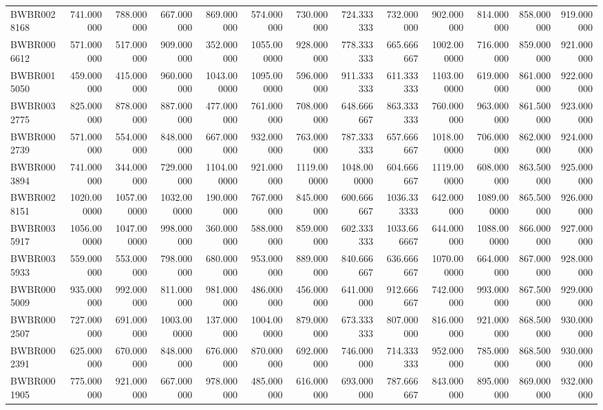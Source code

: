 \begin{longtable}{lrrrrrrrrrrrr}
BWBR0028168 & 741.000000 & 788.000000 & 667.000000 & 869.000000 & 574.000000 & 730.000000 & 724.333333 & 732.000000 & 902.000000 & 814.000000 & 858.000000 & 919.000000 \\
BWBR0006612 & 571.000000 & 517.000000 & 909.000000 & 352.000000 & 1055.000000 & 928.000000 & 778.333333 & 665.666667 & 1002.000000 & 716.000000 & 859.000000 & 921.000000 \\
BWBR0015050 & 459.000000 & 415.000000 & 960.000000 & 1043.000000 & 1095.000000 & 596.000000 & 911.333333 & 611.333333 & 1103.000000 & 619.000000 & 861.000000 & 922.000000 \\
BWBR0032775 & 825.000000 & 878.000000 & 887.000000 & 477.000000 & 761.000000 & 708.000000 & 648.666667 & 863.333333 & 760.000000 & 963.000000 & 861.500000 & 923.000000 \\
BWBR0002739 & 571.000000 & 554.000000 & 848.000000 & 667.000000 & 932.000000 & 763.000000 & 787.333333 & 657.666667 & 1018.000000 & 706.000000 & 862.000000 & 924.000000 \\
BWBR0003894 & 741.000000 & 344.000000 & 729.000000 & 1104.000000 & 921.000000 & 1119.000000 & 1048.000000 & 604.666667 & 1119.000000 & 608.000000 & 863.500000 & 925.000000 \\
BWBR0028151 & 1020.000000 & 1057.000000 & 1032.000000 & 190.000000 & 767.000000 & 845.000000 & 600.666667 & 1036.333333 & 642.000000 & 1089.000000 & 865.500000 & 926.000000 \\
BWBR0035917 & 1056.000000 & 1047.000000 & 998.000000 & 360.000000 & 588.000000 & 859.000000 & 602.333333 & 1033.666667 & 644.000000 & 1088.000000 & 866.000000 & 927.000000 \\
BWBR0035933 & 559.000000 & 553.000000 & 798.000000 & 680.000000 & 953.000000 & 889.000000 & 840.666667 & 636.666667 & 1070.000000 & 664.000000 & 867.000000 & 928.000000 \\
BWBR0005009 & 935.000000 & 992.000000 & 811.000000 & 981.000000 & 486.000000 & 456.000000 & 641.000000 & 912.666667 & 742.000000 & 993.000000 & 867.500000 & 929.000000 \\
BWBR0002507 & 727.000000 & 691.000000 & 1003.000000 & 137.000000 & 1004.000000 & 879.000000 & 673.333333 & 807.000000 & 816.000000 & 921.000000 & 868.500000 & 930.000000 \\
BWBR0002391 & 625.000000 & 670.000000 & 848.000000 & 676.000000 & 870.000000 & 692.000000 & 746.000000 & 714.333333 & 952.000000 & 785.000000 & 868.500000 & 930.000000 \\
BWBR0001905 & 775.000000 & 921.000000 & 667.000000 & 978.000000 & 485.000000 & 616.000000 & 693.000000 & 787.666667 & 843.000000 & 895.000000 & 869.000000 & 932.000000 \\

\end{longtable}
